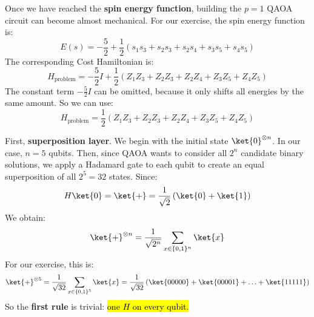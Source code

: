 \highspace
\begin{deepeningbox}
    Once we have reached the \textbf{spin energy function}, building the $p=1$ QAOA circuit can become almost mechanical. For our exercise, the spin energy function is:
    \begin{equation*}
        E(s) = -\frac{5}{2} + \frac{1}{2}\left(s_1s_3 + s_2s_3 + s_2s_4 + s_3s_5 + s_4s_5\right)
    \end{equation*}
    The corresponding Cost Hamiltonian is:
    \begin{equation*}
        H_{\text{problem}} = -\frac{5}{2}I + \frac{1}{2}\left(Z_1Z_3 + Z_2Z_3 + Z_2Z_4 + Z_3Z_5 + Z_4Z_5\right)
    \end{equation*}
    The constant term $-\frac{5}{2}I$ can be omitted, because it only shifts all energies by the same amount. So we can use:
    \begin{equation*}
        H_{\text{problem}} = \frac{1}{2}\left(Z_1Z_3 + Z_2Z_3 + Z_2Z_4 + Z_3Z_5 + Z_4Z_5\right)
    \end{equation*}

    \highspace
     First, \textbf{superposition layer}. We begin with the initial state $\ket{0}^{\otimes n}$. In our case, $n=5$ qubits. Then, since QAOA wants to consider all $2^{n}$ candidate binary solutions, we apply a Hadamard gate to each qubit to create an equal superposition of all $2^{5} = 32$ states. Since:
    \begin{equation*}
        H \ket{0} = \ket{+} = \frac{1}{\sqrt{2}} \left(\ket{0} + \ket{1}\right)
    \end{equation*}
    We obtain:
    \begin{equation*}
        \ket{+}^{\otimes n} = \frac{1}{\sqrt{2^{n}}} \sum_{x \in \{0,1\}^{n}} \ket{x}
    \end{equation*}
    For our exercise, this is:
    \begin{equation*}
        \ket{+}^{\otimes 5} = \frac{1}{\sqrt{32}} \sum_{x \in \{0,1\}^{5}} \ket{x} = \frac{1}{\sqrt{32}} \left(\ket{00000} + \ket{00001} + \ldots + \ket{11111}\right)
    \end{equation*}
    So the \textbf{first rule} is trivial: \hl{one $H$ on every qubit.}


\end{deepeningbox}
